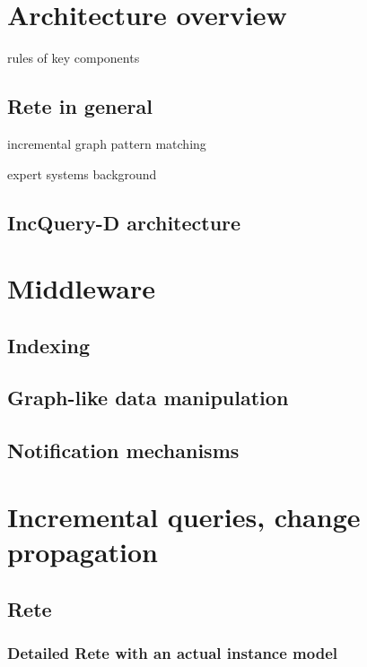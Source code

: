 
\section{Architecture overview}

rules of key components

\subsection{Rete in general}
\label{subsec:rete}

incremental graph pattern matching

expert systems background

\subsection{IncQuery-D architecture}


\section{Middleware}

\subsection{Indexing}

\subsection{Graph-like data manipulation}

\subsection{Notification mechanisms}

\section{Incremental queries, change propagation}

\subsection{Rete}

\subsubsection{Detailed Rete with an actual instance model}


